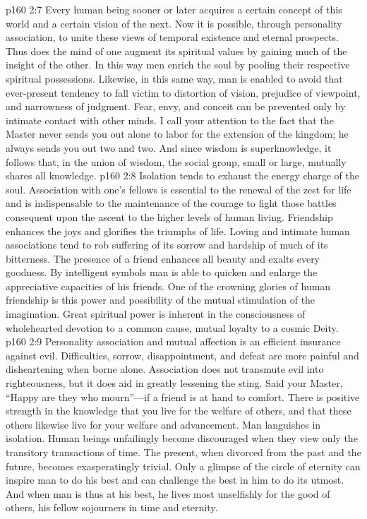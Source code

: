 \pc \vs p160 2:7 \bibnobreakspace {} Every human being sooner or later acquires a certain concept of this world and a certain vision of the next. Now it is possible, through personality association, to unite these views of temporal existence and eternal prospects. Thus does the mind of one augment its spiritual values by gaining much of the insight of the other. In this way men enrich the soul by pooling their respective spiritual possessions. Likewise, in this same way, man is enabled to avoid that ever\hyp{}present tendency to fall victim to distortion of vision, prejudice of viewpoint, and narrowness of judgment. Fear, envy, and conceit can be prevented only by intimate contact with other minds. I call your attention to the fact that the Master never sends you out alone to labor for the extension of the kingdom; he always sends you out two and two. And since wisdom is superknowledge, it follows that, in the union of wisdom, the social group, small or large, mutually shares all knowledge.
\pc \vs p160 2:8 \bibnobreakspace {} Isolation tends to exhaust the energy charge of the soul. Association with one’s fellows is essential to the renewal of the zest for life and is indispensable to the maintenance of the courage to fight those battles consequent upon the ascent to the higher levels of human living. Friendship enhances the joys and glorifies the triumphs of life. Loving and intimate human associations tend to rob suffering of its sorrow and hardship of much of its bitterness. The presence of a friend enhances all beauty and exalts every goodness. By intelligent symbols man is able to quicken and enlarge the appreciative capacities of his friends. One of the crowning glories of human friendship is this power and possibility of the mutual stimulation of the imagination. Great spiritual power is inherent in the consciousness of wholehearted devotion to a common cause, mutual loyalty to a cosmic Deity.
\pc \vs p160 2:9 \bibnobreakspace {} Personality association and mutual affection is an efficient insurance against evil. Difficulties, sorrow, disappointment, and defeat are more painful and disheartening when borne alone. Association does not transmute evil into righteousness, but it does aid in greatly lessening the sting. Said your Master, \textcolor{ubdarkred}{“Happy are they who mourn”}---if a friend is at hand to comfort. There is positive strength in the knowledge that you live for the welfare of others, and that these others likewise live for your welfare and advancement. Man languishes in isolation. Human beings unfailingly become discouraged when they view only the transitory transactions of time. The present, when divorced from the past and the future, becomes exasperatingly trivial. Only a glimpse of the circle of eternity can inspire man to do his best and can challenge the best in him to do its utmost. And when man is thus at his best, he lives most unselfishly for the good of others, his fellow sojourners in time and eternity.

